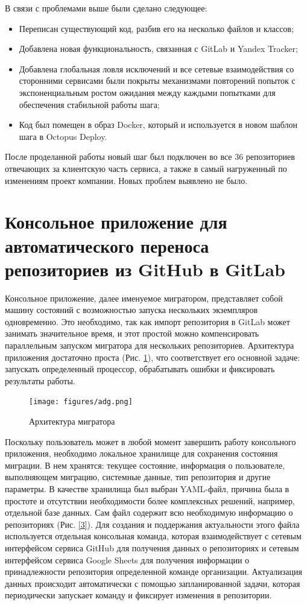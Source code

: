 В связи с проблемами выше были сделано следующее:
\begin{itemize}
  \item Переписан существующий код, разбив его на несколько файлов и классов;
  \item Добавлена новая функциональность, связанная с GitLab и Yandex Tracker;
  \item Добавлена глобальная ловля исключений и все сетевые взаимодействия со сторонними сервисами были покрыты механизмами повторений попыток с экспоненциальным ростом ожидания между каждыми попытками для обеспечения стабильной работы шага;
  \item Код был помещен в образ Docker, который и используется в новом шаблон шага в Octopus Deploy.
\end{itemize}

После проделанной работы новый шаг был подключен во все 36 репозиториев отвечающих за клиентскую часть сервиса, а также в самый нагруженный по изменениям проект компании. Новых проблем выявлено не было.

\section{Консольное приложение для автоматического переноса репозиториев из GitHub в GitLab}
Консольное приложение, далее именуемое мигратором, представляет собой машину состояний с возможностью запуска нескольких экземпляров одновременно. Это необходимо, так как импорт репозитория в GitLab может занимать значительное время, и этот простой можно компенсировать параллельным запуском мигратора для нескольких репозиториев. Архитектура приложения достаточно проста (Рис. \ref{2}), что соответствует его основной задаче: запускать определенный процессор, обрабатывать ошибки и фиксировать результаты работы.

\begin{figure}[H]
  \centering
  \texttt{[image: figures/adg.png]}
  \caption{Архитектура мигратора}
  \label{2}
\end{figure}

Поскольку пользователь может в любой момент завершить работу консольного приложения, необходимо локальное хранилище для сохранения состояния миграции. В нем хранятся: текущее состояние, информация о пользователе, выполняющем миграцию, системные данные, тип репозитория и другие параметры. В качестве хранилища был выбран YAML-файл, причина была в простоте и отсутствии необходимости более комплексных решений, например, отдельной базе данных. Сам файл содержит всю необходимую информацию о репозиториях (Рис. \ref{3}). Для создания и поддержания актуальности этого файла используется отдельная консольная команда, которая взаимодействует с сетевым интерфейсом сервиса GitHub для получения данных о репозиториях и сетевым интерфейсом сервиса Google Sheets для получения информации о принадлежности репозитория определенной команде организации. Актуализация данных происходит автоматически с помощью запланированной задачи, которая периодически запускает команду и фиксирует изменения в репозитории.

